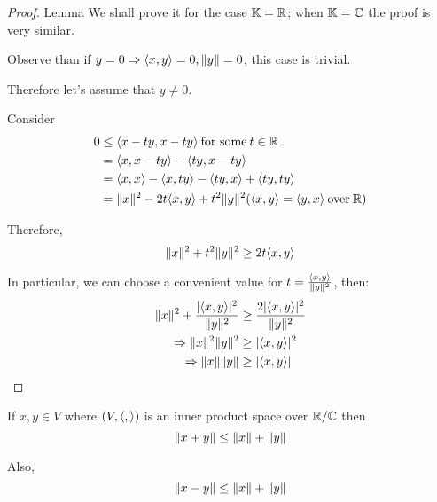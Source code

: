\begin{proof} {Lemma}
    We shall prove it for the case \(\mathbb{K} = \mathbb{R}\); when \(\mathbb{K} = \mathbb{C}\) the proof is very similar.

    Observe than if \(y= 0 \Rightarrow \langle x, y \rangle = 0, \lVert y\rVert = 0\), this case is trivial.

    Therefore let's assume that \(y \neq 0\).

    Consider \begin{align*}
        0 & \leq \langle x - ty, x - ty \rangle \:\text{for some}\:  t \in \mathbb{R}                                                      \\
          & = \langle x, x - ty \rangle - \langle ty,  x- ty \rangle                                                                  \\
          & = \langle x, x \rangle - \langle x, ty \rangle - \langle ty, x \rangle + \langle ty, ty \rangle                             \\
          & = \lVert x\rVert^2 - 2t \langle x, y \rangle + t^2 \lVert y\rVert^2 (\langle x, y \rangle = \langle y, x \rangle \:\text{over}\: \mathbb{R}) \\
    \end{align*}

    Therefore, \[
        \lVert x\rVert^2 + t^2 \lVert y\rVert^2 \geq 2t \langle x, y \rangle
    \]

    In particular, we can choose a convenient value for \(t = \frac{\langle x, y \rangle}{\lVert y\rVert^2} \), then: \begin{align*}
        \lVert x\rVert^2 + \dfrac{\lvert\langle x, y \rangle\rvert^2 }{\lVert y\rVert^2} & \geq \dfrac{2\lvert\langle x, y \rangle\rvert^2 }{\lVert y\rVert^2} \\
        \Rightarrow \lVert x\rVert^2 \lVert y\rVert^2                                & \geq \lvert\langle x, y \rangle\rvert^2                       \\
        \Rightarrow \lVert x\rVert \lVert y\rVert                                    & \geq \lvert\langle x, y \rangle\rvert
    \end{align*}
\end{proof}

\begin{corollary} 
    If \(x, y \in V\) where \((V, \langle ,  \rangle)\) is an inner product space over \(\mathbb{R} / \mathbb{C}\) then \[
        \lVert x + y\rVert \leq \lVert x\rVert + \lVert y\rVert
    \]

    Also, \[
        \lVert x - y\rVert \leq \lVert x\rVert + \lVert y\rVert
    \]
\end{corollary}

